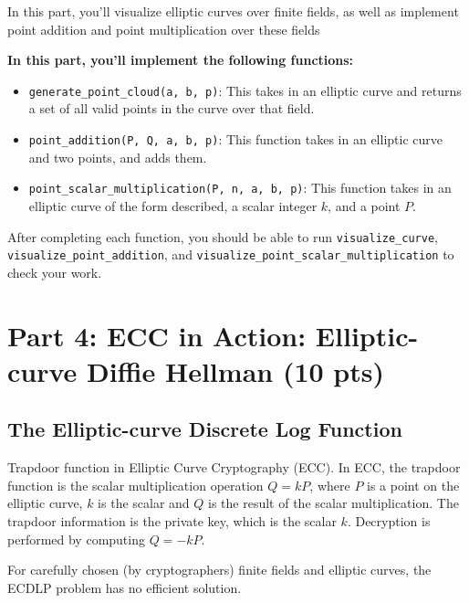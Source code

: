 \documentclass{article}
\begin{document}
    \begin{tcolorbox}[enhanced,interior style={top color=Plum!20,bottom color=Plum!30}]
        In this part, you'll visualize elliptic curves over finite fields, as well as implement point addition and point multiplication over these fields
    
        \textbf{In this part, you'll implement the following functions:}
        \begin{itemize}
            \item \lstinline{generate_point_cloud(a, b, p)}: This takes in an elliptic curve and returns a set of all valid points in the curve over that field.
            \item \lstinline{point_addition(P, Q, a, b, p)}: This function takes in an elliptic curve and two points, and adds them.
            \item \lstinline{point_scalar_multiplication(P, n, a, b, p)}: This function takes in an elliptic curve of the form described, a scalar integer $k$, and a point $P$.
        \end{itemize}
        After completing each function, you should be able to run \lstinline{visualize_curve}, \lstinline{visualize_point_addition}, and \lstinline{visualize_point_scalar_multiplication} to check your work.
    \end{tcolorbox}

\section*{Part 4: ECC in Action: Elliptic-curve Diffie Hellman (10 pts)}

\subsection*{The Elliptic-curve Discrete Log Function}



\vspace{3mm}
Trapdoor function in Elliptic Curve Cryptography (ECC). In ECC, the trapdoor function is the scalar multiplication operation $Q = kP$, where $P$ is a point on the elliptic curve, $k$ is the scalar and $Q$ is the result of the scalar multiplication. The trapdoor information is the private key, which is the scalar $k$. Decryption is performed by computing $Q = -kP$.


For carefully chosen (by cryptographers) finite fields and elliptic curves, the ECDLP problem has no efficient solution.
\end{document}
